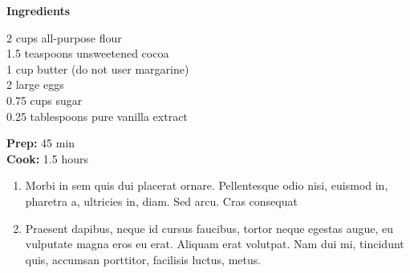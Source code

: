 \documentclass[a4paper]{article}
\newcommand{\ingredient}[1]{
  \vspace{0.1cm}
  \hspace{0cm}
  {#1}\\
}
\newcommand{\prep}[1]{
  \textbf{Prep:} {#1}\\
}
\newcommand{\cooking}[1]{
  \textbf{Cook:} {#1}\\
}
\begin{document}
\begin{multicols}{3}
  \normalsize
  \raggedright
  \textbf{Ingredients}\\
  \vspace{0.2cm}
      \ingredient{2 cups all-purpose flour}
      \ingredient{1.5 teaspoons unsweetened cocoa}
      \ingredient{1 cup butter (do not user margarine)}
      \ingredient{2 large eggs}
      \ingredient{0.75 cups sugar}
      \ingredient{0.25 tablespoons pure vanilla extract}
    \vspace{0.5cm}
    \prep{45 min} %
    \cooking{1.5 hours} %
  \columnbreak
  \begin{enumerate}[leftmargin=0.3cm]
    \item{Morbi in sem quis dui placerat ornare. Pellentesque odio nisi, euismod in, pharetra a, ultricies in, diam. Sed arcu. Cras consequat} %
    \item{Praesent dapibus, neque id cursus faucibus, tortor neque egestas augue, eu vulputate magna eros eu erat. Aliquam erat volutpat. Nam dui mi, tincidunt quis, accumsan porttitor, facilisis luctus, metus.} %

\end{enumerate}
\end{multicols}
\end{document}

